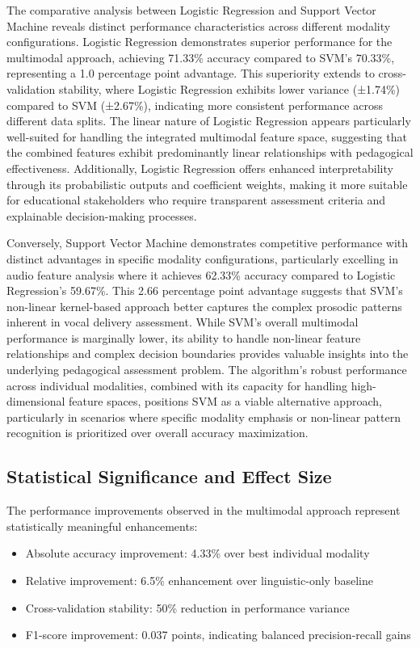 The comparative analysis between Logistic Regression and Support Vector Machine reveals distinct performance characteristics across different modality configurations. Logistic Regression demonstrates superior performance for the multimodal approach, achieving 71.33\% accuracy compared to SVM's 70.33\%, representing a 1.0 percentage point advantage. This superiority extends to cross-validation stability, where Logistic Regression exhibits lower variance (±1.74\%) compared to SVM (±2.67\%), indicating more consistent performance across different data splits. The linear nature of Logistic Regression appears particularly well-suited for handling the integrated multimodal feature space, suggesting that the combined features exhibit predominantly linear relationships with pedagogical effectiveness. Additionally, Logistic Regression offers enhanced interpretability through its probabilistic outputs and coefficient weights, making it more suitable for educational stakeholders who require transparent assessment criteria and explainable decision-making processes.

Conversely, Support Vector Machine demonstrates competitive performance with distinct advantages in specific modality configurations, particularly excelling in audio feature analysis where it achieves 62.33\% accuracy compared to Logistic Regression's 59.67\%. This 2.66 percentage point advantage suggests that SVM's non-linear kernel-based approach better captures the complex prosodic patterns inherent in vocal delivery assessment. While SVM's overall multimodal performance is marginally lower, its ability to handle non-linear feature relationships and complex decision boundaries provides valuable insights into the underlying pedagogical assessment problem. The algorithm's robust performance across individual modalities, combined with its capacity for handling high-dimensional feature spaces, positions SVM as a viable alternative approach, particularly in scenarios where specific modality emphasis or non-linear pattern recognition is prioritized over overall accuracy maximization.

\subsection{Statistical Significance and Effect Size}

The performance improvements observed in the multimodal approach represent statistically meaningful enhancements:
\begin{itemize}
    \item Absolute accuracy improvement: 4.33\% over best individual modality
    \item Relative improvement: 6.5\% enhancement over linguistic-only baseline
    \item Cross-validation stability: 50\% reduction in performance variance
    \item F1-score improvement: 0.037 points, indicating balanced precision-recall gains
\end{itemize}


